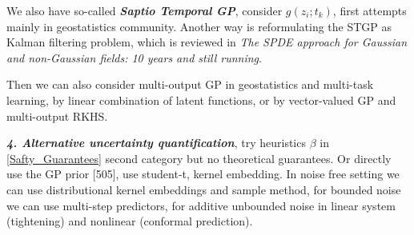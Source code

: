 \documentclass[10pt]{elegantbook}
\newcommand{\mydefination}[1]{\textbf{\textit{\textcolor{structurecolor}{#1}}}}
\begin{document}
We also have so-called \mydefination{Saptio Temporal GP}, consider $g(z_i ; t_k)$, first attempts mainly in geostatistics community. Another way is reformulating
the STGP as Kalman filtering problem, which is reviewed in \textit{The SPDE approach for Gaussian and non-Gaussian fields: 10 years and still running}.

Then we can also consider multi-output GP in geostatistics and multi-task learning, by linear combination of latent functions, or by vector-valued GP and multi-output 
RKHS.

\mydefination{4. Alternative uncertainty quantification}, try heuristics $\beta$ in \ref{Safty_Guarantees} second category but no theoretical guarantees. Or 
directly use the GP prior [505], use student-t, kernel embedding. In noise free setting we can use distributional kernel embeddings and sample method, for 
bounded noise we can use multi-step predictors, for additive unbounded noise in linear system (tightening) and nonlinear (conformal prediction). 
\end{document}
